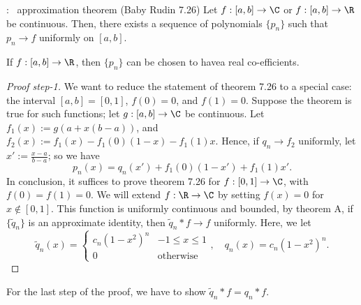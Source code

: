 \begin{ntheorem}{: \Weierstass~approximation theorem (Baby Rudin 7.26)}
    Let \(f:[a,b]\to\C\) or \(f:[a,b]\to\R\) be continuous. Then, there exists a sequence of polynomials \(\{p_n\}\) such that \(p_n\to f\) uniformly on \([a,b]\). 

    \medskip

    If \(f:[a,b]\to\R\), then \(\{p_n\}\) can be chosen to havea real co-efficients.
\end{ntheorem}
\begin{proof}[Proof step-1]
    We want to reduce the statement of theorem 7.26 to a special case: the interval \([a,b]=[0,1]\), \(f(0)=0\), and \(f(1)=0\). Suppose the theorem is true for such functions; let \(g:[a,b]\to\C\) be continuous. Let \(f_1(x):=g\left(a+x(b-a)\right)\), and \(f_2(x):=f_1(x)-f_1(0)(1-x)-f_1(1)x\). Hence, if \(q_n\to f_2\) uniformly, let \(x':=\displaystyle \frac{x-a}{b-a}\); so we have
    \begin{equation*} 
        p_n(x)=q_n(x')+f_1(0)(1-x')+f_1(1)x'.
    \end{equation*}
    In conclusion, it suffices to prove theorem 7.26 for \(f:[0,1]\to\C\), with \(f(0)=f(1)=0\). We will extend \(f:\R\to\C\) by setting \(f(x)=0\) for \(x\notin [0,1]\). This function is uniformly continuous and bounded, by theorem A, if \(\{\tilde{q}_n\}\) is an approximate identity, then \(\tilde{q}_n\ast f\to f\) uniformly. Here, we let
    \begin{equation*} 
        \tilde{q}_n(x)=\begin{cases}
                        c_n(1-x^2)^n&-1\leq x\leq 1\\
                        0&\text{otherwise}
                    \end{cases},\quad q_n(x)=c_n(1-x^2)^n.
    \end{equation*}
\end{proof}
For the last step of the proof, we have to show \(\tilde{q}_n\ast f=q_n\ast f\).

